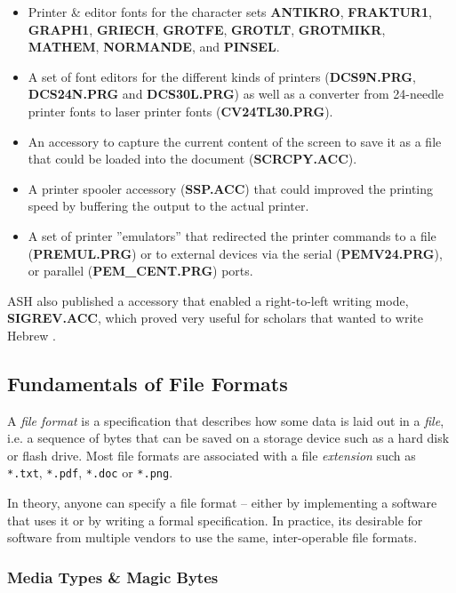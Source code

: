 \begin{itemize}
    \item Printer \& editor fonts for the character sets \textbf{ANTIKRO}, \textbf{FRAKTUR1}, \textbf{GRAPH1}, \textbf{GRIECH}, \textbf{GROTFE}, \textbf{GROTLT}, \textbf{GROTMIKR}, \textbf{MATHEM}, \textbf{NORMANDE}, and \textbf{PINSEL}.
    \item A set of font editors for the different kinds of printers (\textbf{DCS9N.PRG}, \textbf{DCS24N.PRG} and \textbf{DCS30L.PRG}) as well as a converter from 24-needle printer fonts to laser printer fonts (\textbf{CV24TL30.PRG}).
    \item An \gls{accessory} to capture the current content of the screen to save it as a file that could be loaded into the document (\textbf{SCRCPY.ACC}).
    \item A printer spooler accessory (\textbf{SSP.ACC}) that could improved the printing speed by buffering the output to the actual printer.
    \item A set of printer ''emulators'' that redirected the printer commands to a file (\textbf{PREMUL.PRG}) or to external devices via the serial (\textbf{PEMV24.PRG}), or parallel (\textbf{PEM\_CENT.PRG}) ports.
\end{itemize}

ASH also published a \Signum{} accessory that enabled a right-to-left writing mode, \textbf{SIGREV.ACC}, which proved very useful for scholars that wanted to write Hebrew \cite{stc1988sigrevers}.

\subsection{Fundamentals of File Formats}

A \textit{file format} is a specification that describes how some data is laid out in a \textit{file}, i.e. a sequence of \glspl{byte} that can be saved on a storage device such as a hard disk or flash drive. Most file formats are associated with a file \textit{extension} such as \texttt{*.txt}, \texttt{*.pdf}, \texttt{*.doc} or \texttt{*.png}.

In theory, anyone can specify a file format – either by implementing a software that uses it or by writing a formal specification. In practice, its desirable for software from multiple vendors to use the same, inter-operable file formats.

\subsubsection{Media Types \& Magic Bytes}

